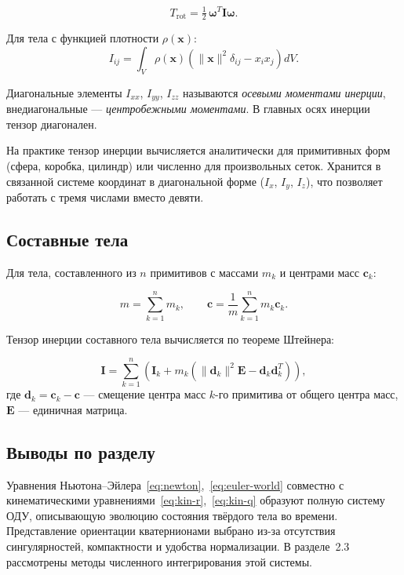 \begin{equation}
  T_{\text{rot}} = \tfrac{1}{2}\,\boldsymbol{\omega}^T \mathbf{I}\boldsymbol{\omega}.
\end{equation}

Для тела с функцией плотности $\rho(\mathbf{x})$:
\begin{equation}
  I_{ij} = \int_V \rho(\mathbf{x})\left(\|\mathbf{x}\|^2 \delta_{ij} - x_i x_j\right) dV.
  \label{eq:inertia-tensor}
\end{equation}

Диагональные элементы $I_{xx}$, $I_{yy}$, $I_{zz}$ называются \emph{осевыми моментами инерции}, 
внедиагональные --- \emph{центробежными моментами}. В главных осях инерции тензор диагонален.

На практике тензор инерции вычисляется аналитически для примитивных форм (сфера, коробка, цилиндр) или 
численно для произвольных сеток. Хранится в связанной системе координат в диагональной форме ($I_x$, $I_y$, 
$I_z$), что позволяет работать с тремя числами вместо девяти.

\subsection{Составные тела}

Для тела, составленного из $n$ примитивов с массами $m_k$ и центрами масс $\mathbf{c}_k$:

\begin{equation}
  m = \sum_{k=1}^n m_k, \qquad
  \mathbf{c} = \frac{1}{m}\sum_{k=1}^n m_k \mathbf{c}_k.
\end{equation}

Тензор инерции составного тела вычисляется по теореме Штейнера:

\begin{equation}
  \mathbf{I} = \sum_{k=1}^n \left(\mathbf{I}_k + m_k\left(\|\mathbf{d}_k\|^2\mathbf{E} - \mathbf{d}_k\mathbf{d}_k^T\right)\right),
\end{equation}
где $\mathbf{d}_k = \mathbf{c}_k - \mathbf{c}$ — смещение центра масс $k$-го примитива от общего центра масс, $\mathbf{E}$ — единичная матрица.

\subsection{Выводы по разделу}

Уравнения Ньютона–Эйлера~\eqref{eq:newton},~\eqref{eq:euler-world} совместно с кинематическими 
уравнениями~\eqref{eq:kin-r},~\eqref{eq:kin-q} образуют полную систему ОДУ, описывающую эволюцию состояния 
твёрдого тела во времени. Представление ориентации кватернионами выбрано из-за отсутствия сингулярностей, 
компактности и удобства нормализации. В разделе~2.3 рассмотрены методы численного интегрирования этой системы.
